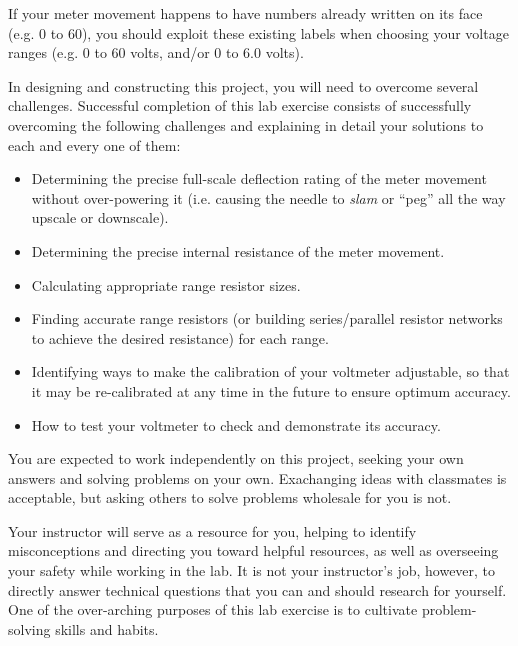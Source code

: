 If your meter movement happens to have numbers already written on its face (e.g. 0 to 60), you should exploit these existing labels when choosing your voltage ranges (e.g. 0 to 60 volts, and/or 0 to 6.0 volts).

\vskip 10pt

\filbreak

In designing and constructing this project, you will need to overcome several challenges.  Successful completion of this lab exercise consists of successfully overcoming the following challenges and explaining in detail your solutions to each and every one of them:

\begin{itemize}
\item{} Determining the precise full-scale deflection rating of the meter movement without over-powering it (i.e. causing the needle to {\it slam} or ``peg'' all the way upscale or downscale).
\item{} Determining the precise internal resistance of the meter movement.
\item{} Calculating appropriate range resistor sizes.
\item{} Finding accurate range resistors (or building series/parallel resistor networks to achieve the desired resistance) for each range.
\item{} Identifying ways to make the calibration of your voltmeter adjustable, so that it may be re-calibrated at any time in the future to ensure optimum accuracy.
\item{} How to test your voltmeter to check and demonstrate its accuracy.
\end{itemize}

You are expected to work independently on this project, seeking your own answers and solving problems on your own.  Exachanging ideas with classmates is acceptable, but asking others to solve problems wholesale for you is not.

Your instructor will serve as a resource for you, helping to identify misconceptions and directing you toward helpful resources, as well as overseeing your safety while working in the lab.  It is not your instructor's job, however, to directly answer technical questions that you can and should research for yourself.  One of the over-arching purposes of this lab exercise is to cultivate problem-solving skills and habits.

















